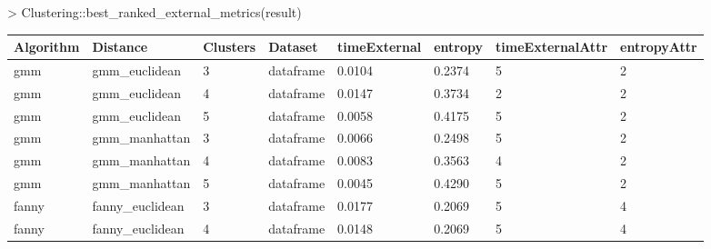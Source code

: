 \begin{Schunk}
\begin{Sinput}
> Clustering::best_ranked_external_metrics(result)
\end{Sinput}
\end{Schunk}
{\small
\begin{longtable}{| p{1cm} | p{1.8cm} | p{0.9cm} | p{1.1cm} | p{1.6cm} | p{0.8cm} | p{1.8cm} | p{1.5cm} |}
\hline
\scriptsize Algorithm  & \scriptsize     Distance    &  \scriptsize Clusters &  \scriptsize  Dataset   & \scriptsize timeExternal  & \scriptsize entropy   & \scriptsize timeExternalAttr & \scriptsize entropyAttr \\
\hline
\scriptsize   gmm      & \scriptsize   gmm\_euclidean & \scriptsize     3     & \scriptsize dataframe  & \scriptsize     0.0104    & \scriptsize 0.2374 &  \scriptsize        5        & \scriptsize      2 \\
\scriptsize   gmm      & \scriptsize   gmm\_euclidean & \scriptsize     4     & \scriptsize dataframe  & \scriptsize     0.0147    & \scriptsize 0.3734 &  \scriptsize        2        & \scriptsize      2\\
\scriptsize   gmm      & \scriptsize   gmm\_euclidean & \scriptsize     5     & \scriptsize dataframe  & \scriptsize     0.0058    & \scriptsize 0.4175 &  \scriptsize        5        & \scriptsize      2 \\
\cline{2-8}
\scriptsize   gmm      & \scriptsize   gmm\_manhattan & \scriptsize     3     & \scriptsize dataframe  & \scriptsize     0.0066    & \scriptsize 0.2498 &  \scriptsize        5        & \scriptsize      2 \\
\scriptsize   gmm      & \scriptsize   gmm\_manhattan & \scriptsize     4     & \scriptsize dataframe  & \scriptsize     0.0083    & \scriptsize 0.3563 &  \scriptsize        4        & \scriptsize      2 \\
\scriptsize   gmm      & \scriptsize   gmm\_manhattan & \scriptsize     5     & \scriptsize dataframe  & \scriptsize     0.0045    & \scriptsize 0.4290 &  \scriptsize        5        & \scriptsize      2 \\
\hline
\scriptsize fanny      & \scriptsize fanny\_euclidean & \scriptsize     3     & \scriptsize dataframe  & \scriptsize     0.0177    & \scriptsize 0.2069 &  \scriptsize        5        & \scriptsize      4 \\
\scriptsize fanny      & \scriptsize fanny\_euclidean & \scriptsize     4     & \scriptsize dataframe  & \scriptsize     0.0148    & \scriptsize 0.2069 &  \scriptsize        5        & \scriptsize      4 \\

\end{longtable}}

